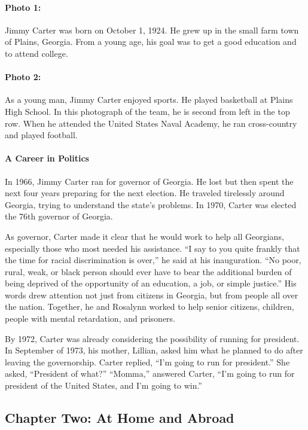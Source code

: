 \documentclass{article}
\begin{document}
\paragraph{Photo 1: }
Jimmy Carter was born on October 1, 1924. He grew up in the small farm town of Plains, Georgia. From a young age, his goal was to get a good education and to attend college.

\paragraph{Photo 2: }
As a young man, Jimmy Carter enjoyed sports. He played basketball at Plains High School. In this photograph of the team, he is second from left in the top row. When he attended the United States Naval Academy, he ran cross-country and played football.

\paragraph{A Career in Politics}
In 1966, Jimmy Carter ran for governor of Georgia. He lost but then spent the next four years preparing for the next election. He traveled tirelessly around Georgia, trying to understand the state's problems. In 1970, Carter was elected the 76th governor of Georgia.

As governor, Carter made it clear that he would work to help all Georgians, especially those who most needed his assistance. ``I say to you quite frankly that the time for racial discrimination is over,'' he said at his inauguration. ``No poor, rural, weak, or black person should ever have to bear the additional burden of being deprived of the opportunity of an education, a job, or simple justice.'' His words drew attention not just from citizens in Georgia, but from people all over the nation. Together, he and Rosalynn worked to help senior citizens, children, people with mental retardation, and prisoners.

By 1972, Carter was already considering the possibility of running for president. In September of 1973, his mother, Lillian, asked him what he planned to do after leaving the governorship. Carter replied, ``I'm going to run for president.'' She asked, ``President of what?'' ``Momma,'' answered Carter, ``I'm going to run for president of the United States, and I'm going to win.''

\subsection*{Chapter Two: At Home and Abroad}
\end{document}
